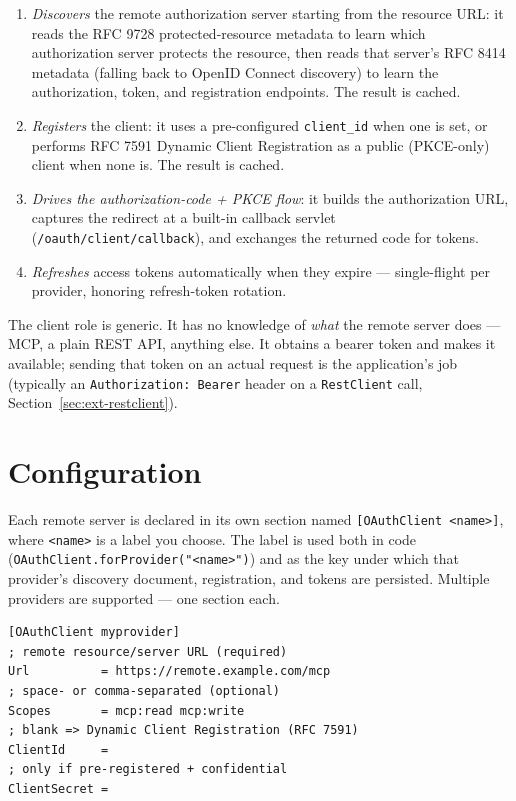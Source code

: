 \begin{enumerate}
  \item \emph{Discovers} the remote authorization server starting from the resource URL: it reads the RFC 9728 protected-resource metadata to learn which authorization server protects the resource, then reads that server's RFC 8414 metadata (falling back to OpenID Connect discovery) to learn the authorization, token, and registration endpoints.  The result is cached.
  \item \emph{Registers} the client: it uses a pre-configured \texttt{client\_id} when one is set, or performs RFC 7591 Dynamic Client Registration as a public (PKCE-only) client when none is.  The result is cached.
  \item \emph{Drives the authorization-code + PKCE flow}: it builds the authorization URL, captures the redirect at a built-in callback servlet (\texttt{/oauth/client/callback}), and exchanges the returned code for tokens.
  \item \emph{Refreshes} access tokens automatically when they expire --- single-flight per provider, honoring refresh-token rotation.
\end{enumerate}

\begin{notebox}
The client role is generic.  It has no knowledge of \emph{what} the remote server does --- MCP, a plain REST API, anything else.  It obtains a bearer token and makes it available; sending that token on an actual request is the application's job (typically an \texttt{Authorization: Bearer} header on a \texttt{RestClient} call, Section~\ref{sec:ext-restclient}).
\end{notebox}

\section{Configuration}
\label{sec:oc-config}

Each remote server is declared in its own section named \texttt{[OAuthClient <name>]}, where \texttt{<name>} is a label you choose.  The label is used both in code (\texttt{OAuthClient.for\-Provider("<name>")}) and as the key under which that provider's discovery document, registration, and tokens are persisted.  Multiple providers are supported --- one section each.

\begin{lstlisting}[style=ini]
[OAuthClient myprovider]
; remote resource/server URL (required)
Url          = https://remote.example.com/mcp
; space- or comma-separated (optional)
Scopes       = mcp:read mcp:write
; blank => Dynamic Client Registration (RFC 7591)
ClientId     =
; only if pre-registered + confidential
ClientSecret =
\end{lstlisting}

